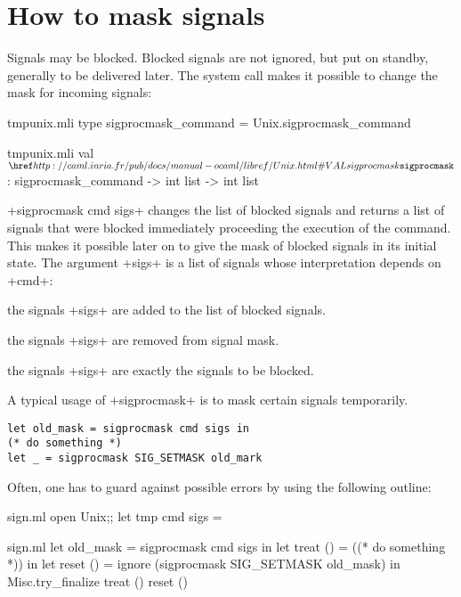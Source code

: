 \section{How to mask signals}

Signals may be blocked.  Blocked signals are not ignored, but put on 
standby, generally to be delivered later.  The 
 system call makes it possible to change the mask
for incoming signals:
%
\begin{codefile}{tmpunix.mli}
type sigprocmask_command = Unix.sigprocmask_command
\end{codefile}
%
\begin{listingcodefile}{tmpunix.mli}
val $\libvalue{Unix}{sigprocmask}$ : sigprocmask_command -> int list -> int list
\end{listingcodefile}
%
\ml+sigprocmask cmd sigs+ changes the list of blocked signals and 
returns a list of signals that were blocked immediately proceeding 
the execution of the command.  This makes it possible later on to 
give the mask of blocked signals in its initial state.  The argument 
\ml+sigs+ is a list of signals whose interpretation depends on \ml+cmd+:

\begin{mltypecases}
 the signals \ml+sigs+ are added
to the list of blocked signals.

 the signals \ml+sigs+ are removed
from signal mask.

 the signals \ml+sigs+ are exactly the 
signals to be blocked.
\end{mltypecases}
%
A typical usage of \ml+sigprocmask+ is to mask certain
signals temporarily.

%
\begin{lstlisting}
let old_mask = sigprocmask cmd sigs in 
(* do something *)
let _ = sigprocmask SIG_SETMASK old_mark
\end{lstlisting}
%
Often, one has to guard against possible errors by using
the following outline:

%
\begin{codefile}{sign.ml}
open Unix;;
let tmp cmd sigs = 
\end{codefile}
%
\begin{listingcodefile}{sign.ml}
let old_mask = sigprocmask cmd sigs in 
let treat () = ((* do something *)) in
let reset () = ignore (sigprocmask SIG_SETMASK old_mask) in
Misc.try_finalize treat () reset ()
\end{listingcodefile}

